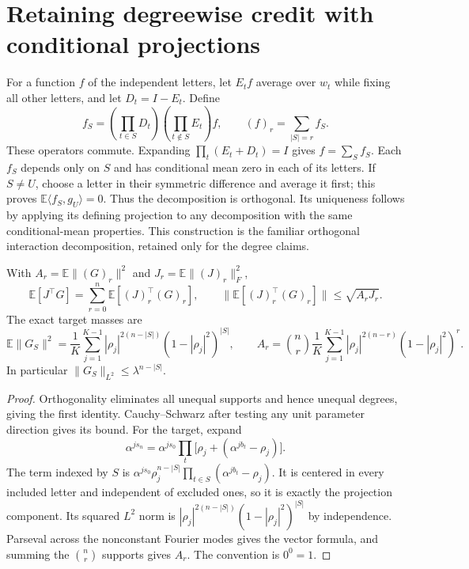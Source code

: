 \section{Retaining degreewise credit with conditional projections}\label{sec:retain-credit}
For a function $f$ of the independent letters, let $E_t f$ average over $w_t$ while fixing all other letters, and let $D_t=I-E_t$. Define
\[
 f_S=\left(\prod_{t\in S}D_t\right)\left(\prod_{t\notin S}E_t\right)f,\qquad
 (f)_r=\sum_{|S|=r}f_S.
\]
These operators commute. Expanding $\prod_t(E_t+D_t)=I$ gives $f=\sum_S f_S$. Each $f_S$ depends only on $S$ and has conditional mean zero in each of its letters. If $S\ne U$, choose a letter in their symmetric difference and average it first; this proves $\mathbb E\langle f_S,g_U\rangle=0$. Thus the decomposition is orthogonal. Its uniqueness follows by applying its defining projection to any decomposition with the same conditional-mean properties. This construction is the familiar orthogonal interaction decomposition, retained only for the degree claims.

\begin{lemma}\label{lem:target-contraction}
With $A_r=\mathbb E\|(G)_r\|^2$ and $J_r=\mathbb E\|(J)_r\|_F^2$,
\begin{equation}
 \mathbb E[J^\top G]=\sum_{r=0}^n\mathbb E[(J)_r^\top(G)_r],\qquad
 \|\mathbb E[(J)_r^\top(G)_r]\|\le\sqrt{A_rJ_r}.
 \label{eq:matching}
\end{equation}
The exact target masses are
\[
 \mathbb E\|G_S\|^2=\frac1K\sum_{j=1}^{K-1}|\rho_j|^{2(n-|S|)}(1-|\rho_j|^2)^{|S|},\qquad
 A_r=\binom nr\frac1K\sum_{j=1}^{K-1}|\rho_j|^{2(n-r)}(1-|\rho_j|^2)^r.
\]
In particular $\|G_S\|_{L^2}\le\lambda^{n-|S|}$.
\end{lemma}
\begin{proof}
Orthogonality eliminates all unequal supports and hence unequal degrees, giving the first identity. Cauchy--Schwarz after testing any unit parameter direction gives its bound. For the target, expand
\[
 \alpha^{js_n}=\alpha^{js_0}\prod_t\bigl[\rho_j+(\alpha^{jb_t}-\rho_j)\bigr].
\]
The term indexed by $S$ is $\alpha^{js_0}\rho_j^{n-|S|}\prod_{t\in S}(\alpha^{jb_t}-\rho_j)$. It is centered in every included letter and independent of excluded ones, so it is exactly the projection component. Its squared $L^2$ norm is $|\rho_j|^{2(n-|S|)}(1-|\rho_j|^2)^{|S|}$ by independence. Parseval across the nonconstant Fourier modes gives the vector formula, and summing the $\binom nr$ supports gives $A_r$. The convention is $0^0=1$.
\end{proof}

